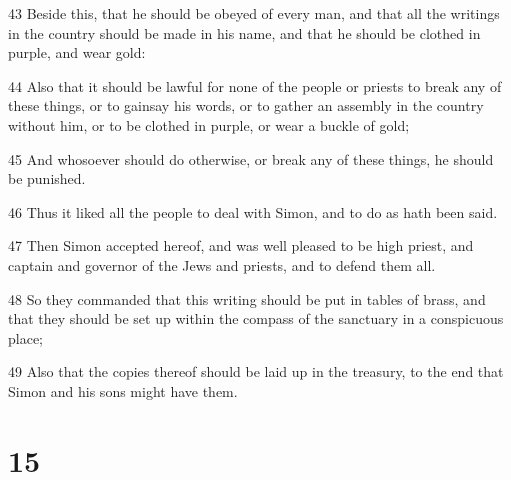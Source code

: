 \par 43 Beside this, that he should be obeyed of every man, and that all the writings in the country should be made in his name, and that he should be clothed in purple, and wear gold:
\par 44 Also that it should be lawful for none of the people or priests to break any of these things, or to gainsay his words, or to gather an assembly in the country without him, or to be clothed in purple, or wear a buckle of gold;
\par 45 And whosoever should do otherwise, or break any of these things, he should be punished.
\par 46 Thus it liked all the people to deal with Simon, and to do as hath been said.
\par 47 Then Simon accepted hereof, and was well pleased to be high priest, and captain and governor of the Jews and priests, and to defend them all.
\par 48 So they commanded that this writing should be put in tables of brass, and that they should be set up within the compass of the sanctuary in a conspicuous place;
\par 49 Also that the copies thereof should be laid up in the treasury, to the end that Simon and his sons might have them.

\chapter{15}

